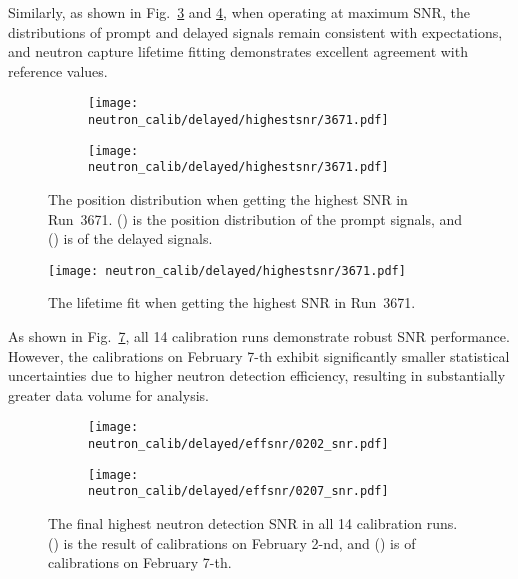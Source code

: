 Similarly, as shown in Fig.~\ref{fig:highestSNRPos} and \ref{fig:3671_HighestSNRDtFit}, when operating at maximum SNR, the distributions of prompt and delayed signals remain consistent with expectations, and neutron capture lifetime fitting demonstrates excellent agreement with reference values.
\begin{figure}[htbp]
	\begin{subfigure}{0.5\textwidth}
		\centering
		\texttt{[image: neutron\_calib/delayed/highestsnr/3671.pdf]}
		\caption{}
		\label{fig:3671HighestSNRProPos}
	\end{subfigure}%
	\begin{subfigure}{0.5\textwidth}
		\centering
		\texttt{[image: neutron\_calib/delayed/highestsnr/3671.pdf]}
		\caption{}
		\label{fig:3671HighestSNRDelPos}
	\end{subfigure}
	\caption{The position distribution when getting the highest SNR in Run~3671. () is the position distribution of the prompt signals, and () is of the delayed signals.}
	\label{fig:highestSNRPos}
\end{figure}
\begin{figure}[htbp]
	\centering
	\texttt{[image: neutron\_calib/delayed/highestsnr/3671.pdf]}
	\caption{The lifetime fit when getting the highest SNR in Run~3671.}
	\label{fig:3671_HighestSNRDtFit}
\end{figure}

As shown in Fig.~\ref{fig:SummarySNR}, all 14 calibration runs demonstrate robust SNR performance. However, the calibrations on February 7-th exhibit significantly smaller statistical uncertainties due to higher neutron detection efficiency, resulting in substantially greater data volume for analysis.
\begin{figure}[htbp]
	\begin{subfigure}{0.5\textwidth}
		\centering
		\texttt{[image: neutron\_calib/delayed/effsnr/0202\_snr.pdf]}
		\caption{}
		\label{fig:SummarySNR0202}
	\end{subfigure}%
	\begin{subfigure}{0.5\textwidth}
		\centering
		\texttt{[image: neutron\_calib/delayed/effsnr/0207\_snr.pdf]}
		\caption{}
		\label{fig:SummarySNR0207}
	\end{subfigure}
	\caption{The final highest neutron detection SNR in all 14 calibration runs. () is the result of calibrations on February 2-nd, and () is of calibrations on February 7-th. }
	\label{fig:SummarySNR}
\end{figure}


